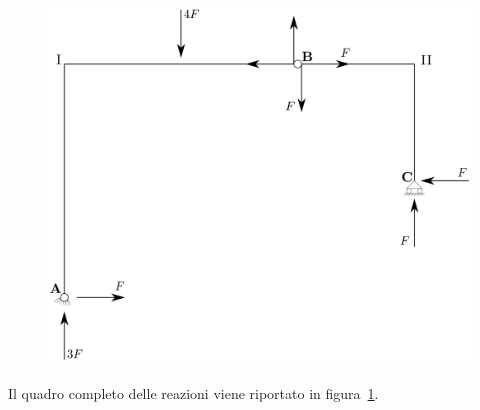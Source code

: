\renewcommand{\thefigure}{8.3~-~5}
\begin{figure}[ht]
\centering
\includegraphics[width=\textwidth]{Immagini/Parte_8/Esercizio8_3/Esercizio8_3_5.pdf}
\caption{}
\label{Esercizio8-3-5}
\end{figure}
Il quadro completo delle reazioni viene riportato in figura~\ref{Esercizio8-3-5}.
